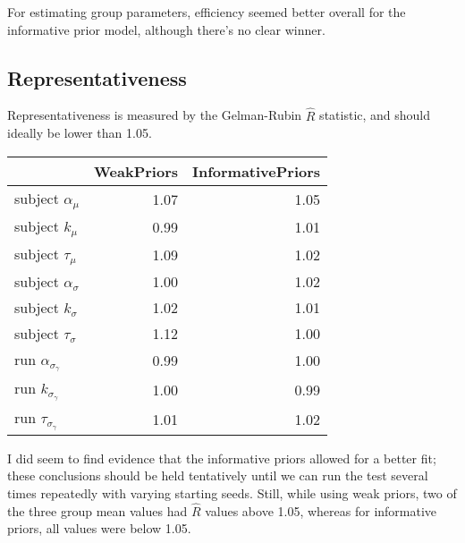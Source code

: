 \documentclass[]{article}
\begin{document}
For estimating group parameters, efficiency seemed better overall for
the informative prior model, although there's no clear winner.

\subsection{Representativeness}\label{representativeness}

Representativeness is measured by the Gelman-Rubin \(\hat{R}\)
statistic, and should ideally be lower than 1.05.

\begin{longtable}[]{@{}lrr@{}}
\toprule
& WeakPriors & InformativePriors\tabularnewline
\midrule
\endhead
subject \(\alpha_{\mu}\) & 1.07 & 1.05\tabularnewline
subject \(k_{\mu}\) & 0.99 & 1.01\tabularnewline
subject \(\tau_{\mu}\) & 1.09 & 1.02\tabularnewline
subject \(\alpha_{\sigma}\) & 1.00 & 1.02\tabularnewline
subject \(k_{\sigma}\) & 1.02 & 1.01\tabularnewline
subject \(\tau_{\sigma}\) & 1.12 & 1.00\tabularnewline
run \(\alpha_{\sigma_{\gamma}}\) & 0.99 & 1.00\tabularnewline
run \(k_{\sigma_{\gamma}}\) & 1.00 & 0.99\tabularnewline
run \(\tau_{\sigma_{\gamma}}\) & 1.01 & 1.02\tabularnewline
\bottomrule
\end{longtable}

I did seem to find evidence that the informative priors allowed for a
better fit; these conclusions should be held tentatively until we can
run the test several times repeatedly with varying starting seeds.
Still, while using weak priors, two of the three group mean values had
\(\hat{R}\) values above 1.05, whereas for informative priors, all
values were below 1.05.
\end{document}
